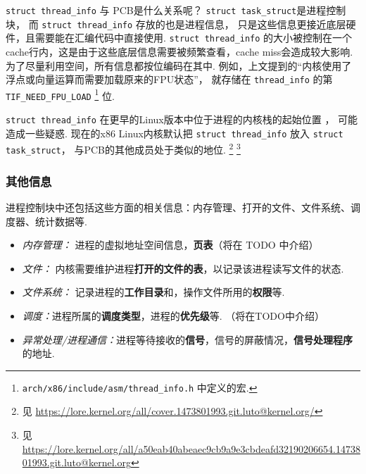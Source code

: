 
\begin{qbox}{\lstinline{struct thread_info} 与 PCB是什么关系呢？}
	\lstinline{struct task_struct}是进程控制块，
	而 \lstinline{struct thread_info} 存放的也是进程信息，
	只是这些信息更接近底层硬件，且需要能在汇编代码中直接使用.
	\lstinline{struct thread_info} 的大小被控制在一个cache行内，这是由于这些底层信息需要被频繁查看，cache miss会造成较大影响.
	为了尽量利用空间，所有信息都按位编码在其中.
	例如，上文提到的“内核使用了浮点或向量运算而需要加载原来的FPU状态”，
	就存储在 \lstinline{thread_info} 的第 \lstinline{TIF_NEED_FPU_LOAD}
	\footnote{\lstinline{arch/x86/include/asm/thread_info.h} 中定义的宏.} 位.

	\lstinline{struct thread_info} 在更早的Linux版本中位于进程的内核栈的起始位置
	\cite{bovet2005understanding}，
	可能造成一些疑惑.
	现在的x86 Linux内核默认把 \lstinline{struct thread_info} 放入
	\lstinline{struct task_struct}，
	与PCB的其他成员处于类似的地位.
	\footnote{见 \url{https://lore.kernel.org/all/cover.1473801993.git.luto@kernel.org/}}
	\footnote{见 \url{https://lore.kernel.org/all/a50eab40abeaec9cb9a9e3cbdeafd32190206654.1473801993.git.luto@kernel.org}}
\end{qbox}

\subsubsection{其他信息}
进程控制块中还包括这些方面的相关信息：内存管理、打开的文件、文件系统、调度器、统计数据等.

\begin{itemize}
	\item\textit{内存管理：} 进程的虚拟地址空间信息，\textbf{页表}（将在 TODO 中介绍）
	\item \textit{文件：} 内核需要维护进程\textbf{打开的文件的表}，以记录该进程读写文件的状态.
	\item \textit{文件系统：} 记录进程的\textbf{工作目录}和，操作文件所用的\textbf{权限}等.
	\item \textit{调度：}进程所属的\textbf{调度类型}，进程的\textbf{优先级}等. （将在TODO中介绍）
	\item \textit{异常处理/进程通信：}进程等待接收的\textbf{信号}，信号的屏蔽情况，\textbf{信号处理程序}的地址.
\end{itemize}
